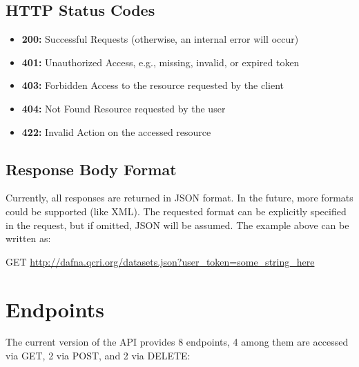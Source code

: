 \documentclass[a4paper,10pt]{scrartcl}
\begin{document}
\subsection{HTTP Status Codes}
\begin{itemize}
 \item \textbf{200:} Successful Requests (otherwise, an internal error will occur)
 \item \textbf{401:} Unauthorized Access, e.g., missing, invalid, or expired token
 \item \textbf{403:} Forbidden Access to the resource requested by the client
 \item \textbf{404:} Not Found Resource requested by the user
 \item \textbf{422:} Invalid Action on the accessed resource
 
\end{itemize}

\subsection{Response Body Format}
Currently, all responses are returned in JSON format. In the future, more formats could be 
supported (like XML). The requested format can be explicitly specified in the request, but if omitted,
JSON will be assumed. The example above can be written as:
\begin{description}
 \item GET \href{http://dafna.qcri.org/datasets.json?user\_token=some\_string\_here}{http://dafna.qcri.org/datasets.json?user\_token=some\_string\_here}
\end{description}

\section{Endpoints}
The current version of the API provides 8 endpoints, 4 among them are accessed via GET, 2 via POST, and 2 via DELETE:
\end{document}
